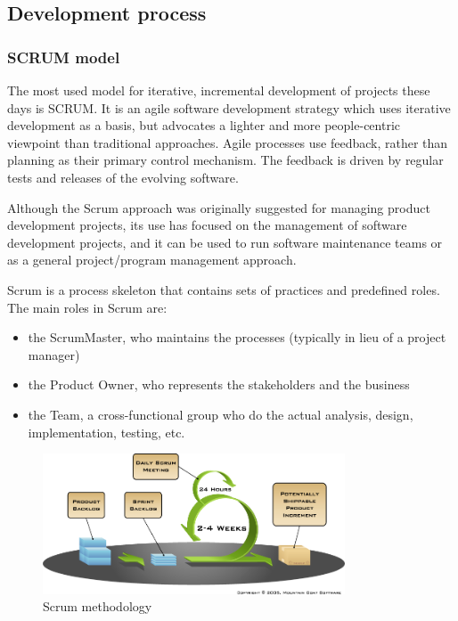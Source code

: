 \subsection{Development process}

\subsubsection{SCRUM model}
	
The most used model for iterative, incremental development of projects these
days is SCRUM. It is an agile software development strategy which uses iterative
development as a basis, but advocates a lighter and more people-centric viewpoint
than traditional approaches. Agile processes use feedback, rather than planning
as their primary control mechanism. The feedback is driven by regular tests and
releases of the evolving software. \cite{wiki:development-process}\newline
	
Although the Scrum approach was originally suggested for managing product development
projects, its use has focused on the management of software development projects,
and it can be used to run software maintenance teams or as a general
project/program management approach.\newline
	
Scrum is a process skeleton that contains sets of practices and predefined roles.
The main roles in Scrum are:
	
\begin{itemize}
	\item the ScrumMaster, who maintains the processes (typically in lieu of a project manager)
	\item the Product Owner, who represents the stakeholders and the business
	\item the Team, a cross-functional group who do the actual analysis, design, implementation, testing, etc.
\end{itemize}

\begin{figure}[htb]
	\centering
	\includegraphics[width=0.8\textwidth]{process/development_process/scrum.png}
	\caption{Scrum methodology\cite{targetprocess:scrum}}
	\label{fig:scrum-methology}
\end{figure}

